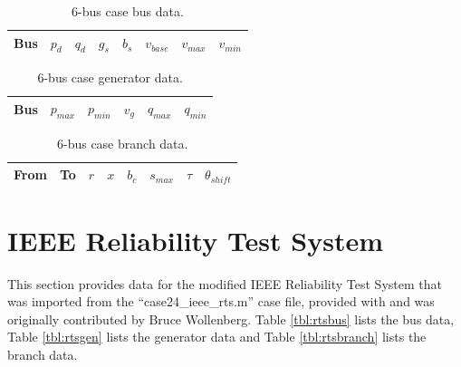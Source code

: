 
\begin{table}[h]
\caption{6-bus case bus data.}
\label{tbl:case6ww_bus}
\begin{center}
\begin{tabular}{c|c|c|c|c|c|c|c}
\hline
Bus &$p_d$ &$q_d$ &$g_s$ &$b_s$ &$v_{base}$ &$v_{max}$ &$v_{min}$\\
\hline\hline

\hline
\end{tabular}
\end{center}
\end{table}

\begin{table}[h]
\caption{6-bus case generator data.}
\label{tbl:case6ww_gen}
\begin{center}
\begin{tabular}{c|c|c|c|c|c}
\hline
Bus &$p_{max}$ &$p_{min}$ &$v_g$ &$q_{max}$ &$q_{min}$\\
\hline\hline

\hline
\end{tabular}
\end{center}
\end{table}

\begin{table}[h]
\caption{6-bus case branch data.}
\label{tbl:case6ww_branch}
\begin{center}
\begin{tabular}{c|c|c|c|c|c|c|c}
\hline
From &To &$r$ &$x$ &$b_c$ &$s_{max}$ &$\tau$ &$\theta_{shift}$\\
\hline\hline

\hline
\end{tabular}
\end{center}
\end{table}

\section{IEEE Reliability Test System}
\label{adx:ieee_rts}
This section provides data for the modified IEEE Reliability Test System that
was imported from the ``case24\_ieee\_rts.m'' case file, provided with \matpower
and was originally contributed by Bruce Wollenberg.
Table \ref{tbl:rtsbus} lists the bus data, Table \ref{tbl:rtsgen} lists the
generator data and Table \ref{tbl:rtsbranch} lists the branch data.

